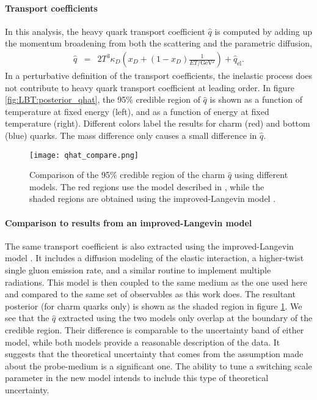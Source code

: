 \paragraph{Transport coefficients} In this analysis, the heavy quark transport coefficient $\hat{q}$ is computed by adding up the momentum broadening from both the scattering and the parametric diffusion,
\begin{eqnarray}\label{eq:qhat}
\hat{q} &=& 2T^3\kappa_D\left(x_D + (1-x_D)\frac{1}{ET/\textrm{GeV}{}^2}\right) + \hat{q}_{\textrm{el}}.
\end{eqnarray}
In a perturbative definition of the transport coefficients, the inelastic process does not contribute to heavy quark transport coefficient at leading order. 
In figure \ref{fig:LBT:posterior_qhat}, the 95\% credible region of $\hat{q}$ is shown as a function of temperature at fixed energy (left), and as a function of energy at fixed temperature (right).
Different colors label the results for charm (red) and bottom (blue) quarks.
The mass difference only causes a small difference in $\hat{q}$.

\begin{figure}
\singlespacing
\centering
\texttt{[image: qhat\_compare.png]}
\caption[Comparison of the 95\% credible region of the charm $\hat{q}$ using]{Comparison of the 95\% credible region of the charm $\hat{q}$ using different models. The red regions use the model described in \cite{Ke:2018tsh}, while the  shaded regions are obtained using  the improved-Langevin model \cite{Cao:2013ita}.}\label{fig:LBT:compare_qhat}
\end{figure}

\paragraph{Comparison to results from an improved-Langevin model}
The same transport coefficient is also extracted using the improved-Langevin model \cite{Cao:2013ita}.
It includes a diffusion modeling of the elastic interaction, a higher-twist single gluon emission rate, and a similar routine to implement multiple radiations.
This model is then coupled to the same medium as the one used here and compared to the same set of observables as this work does.
The resultant posterior (for charm quarks only) is shown as the shaded region in figure \ref{fig:LBT:compare_qhat}.
We see that the $\hat{q}$ extracted using the two models only overlap at the boundary of the credible region.
Their difference is comparable to the uncertainty band of either model, while both models provide a reasonable description of the data.
It suggests that the theoretical uncertainty that comes from the assumption made about the probe-medium is a significant one.
The ability to tune a switching scale parameter in the new model intends to include this type of theoretical uncertainty.

